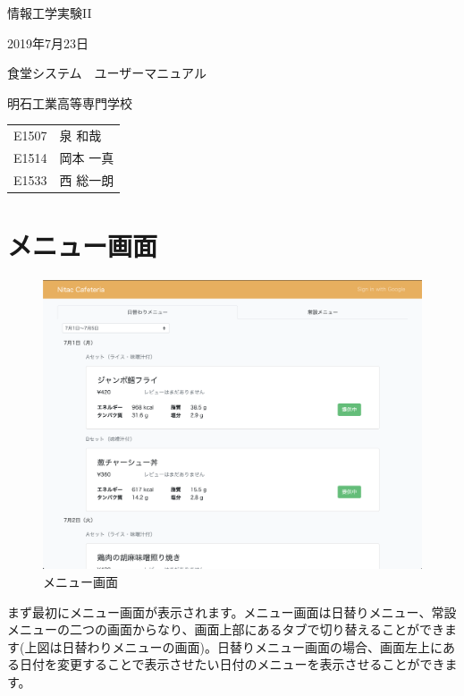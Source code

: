 \documentclass[a4paper]{jsarticle}
\begin{document}

\large
\vspace{-5.0cm}
\hspace{-1.0cm}
情報工学実験II

\hspace{-1.0cm}
2019年7月23日

\Huge
\vspace{1.0cm}
\begin{center}
  食堂システム　ユーザーマニュアル
\end{center}

\vspace{0.5cm}
\begin{center}
  \LARGE
  明石工業高等専門学校
\end{center}

\LARGE
\begin{center}
  \begin{tabular}{rl}
    E1507 & 泉 和哉 \\
    E1514 & 岡本 一真 \\
    E1533 & 西 総一朗
  \end{tabular}
\end{center}

\normalsize

\tableofcontents
\thispagestyle{empty}
\clearpage
\setcounter{page}{1}

\section{メニュー画面}
\begin{figure}[htbp]
	\centering
	\includegraphics[scale = 0.22525]{image/menu.png}
    \caption{メニュー画面}
\end{figure}
まず最初にメニュー画面が表示されます。メニュー画面は日替りメニュー、常設メニューの二つの画面からなり、画面上部にあるタブで切り替えることができます(上図は日替わりメニューの画面)。日替りメニュー画面の場合、画面左上にある日付を変更することで表示させたい日付のメニューを表示させることができます。
\newpage
\end{document}
